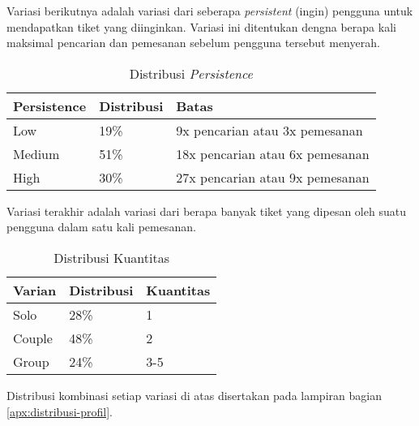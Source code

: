 Variasi berikutnya adalah variasi dari seberapa \textit{persistent} (ingin) pengguna untuk mendapatkan tiket yang diinginkan. Variasi ini ditentukan dengna berapa kali maksimal pencarian dan pemesanan sebelum pengguna tersebut menyerah.

\begin{table}[h]
    \centering
    \begin{tabular}{|l|l|l|}
        \hline
        \textbf{Persistence} & \textbf{Distribusi} & \textbf{Batas}                      \\
        \hline
        Low                  & 19\%                & 9x pencarian atau 3x pemesanan      \\
        \hline
        Medium               & 51\%                & 18x pencarian atau 6x     pemesanan \\
        \hline
        High                 & 30\%                & 27x pencarian atau 9x pemesanan     \\
        \hline
    \end{tabular}
    \caption{Distribusi \textit{Persistence}}
\end{table}

Variasi terakhir adalah variasi dari berapa banyak tiket yang dipesan oleh suatu pengguna dalam satu kali pemesanan.

\begin{table}[h]
    \centering
    \begin{tabular}{|l|l|l|}
        \hline
        \textbf{Varian} & \textbf{Distribusi} & \textbf{Kuantitas} \\
        \hline
        Solo            & 28\%                & 1                  \\
        \hline
        Couple          & 48\%                & 2                  \\
        \hline
        Group           & 24\%                & 3-5                \\
        \hline
    \end{tabular}
    \caption{Distribusi Kuantitas}
\end{table}

Distribusi kombinasi setiap variasi di atas disertakan pada lampiran bagian \ref{apx:distribusi-profil}.